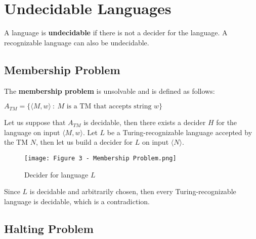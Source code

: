 \documentclass{article}
\begin{document}
\section{Undecidable Languages}
A language is \textbf{undecidable} if there is not a decider for the language. A recognizable language can also be undecidable.
\subsection{Membership Problem}
The \textbf{membership problem} is unsolvable and is defined as follows:
\begin{center}
    $A_{TM} = \{\langle M,w\rangle \ : \ M\text{ is a TM that accepts string } w\}$
\end{center}
Let us suppose that $A_{TM}$ is decidable, then there exists a decider $H$ for the language on input $\langle M,w\rangle$. Let $L$ be a Turing-recognizable language accepted by the TM $N$, then let us build a decider for $L$ on input $\langle N\rangle$.
\begin{figure}[H]
    \centering
    \texttt{[image: Figure 3 - Membership Problem.png]}
    \caption{Decider for language $L$}
\end{figure}
\noindent
Since $L$ is decidable and arbitrarily chosen, then every Turing-recognizable language is decidable, which is a contradiction.
\subsection{Halting Problem}
\end{document}
